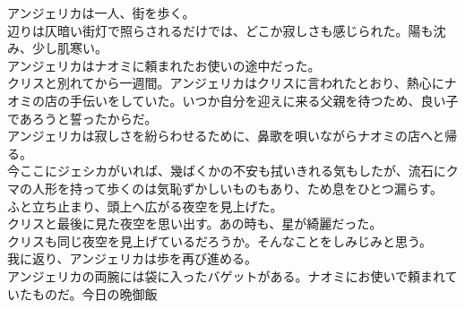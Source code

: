 \documentclass[b5j,10pt,openany]{jsbook}
\begin{document}
アンジェリカは一人、街を歩く。\\辺りは仄暗い街灯で照らされるだけでは、どこか寂しさも感じられた。陽も沈み、少し肌寒い。\\アンジェリカはナオミに頼まれたお使いの途中だった。\\クリスと別れてから一週間。アンジェリカはクリスに言われたとおり、熱心にナオミの店の手伝いをしていた。いつか自分を迎えに来る父親を待つため、良い子であろうと誓ったからだ。\\アンジェリカは寂しさを紛らわせるために、鼻歌を唄いながらナオミの店へと帰る。\\今ここにジェシカがいれば、幾ばくかの不安も拭いきれる気もしたが、流石にクマの人形を持って歩くのは気恥ずかしいものもあり、ため息をひとつ漏らす。\\ふと立ち止まり、頭上へ広がる夜空を見上げた。\\クリスと最後に見た夜空を思い出す。あの時も、星が綺麗だった。\\クリスも同じ夜空を見上げているだろうか。そんなことをしみじみと思う。\\我に返り、アンジェリカは歩を再び進める。\\アンジェリカの両腕には袋に入ったバゲットがある。ナオミにお使いで頼まれていたものだ。今日の晩御飯
\end{document}
